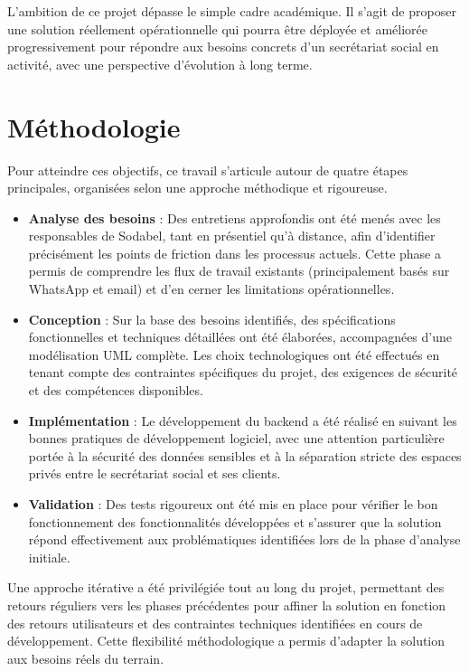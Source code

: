 L'ambition de ce projet dépasse le simple cadre académique. Il s'agit de proposer une solution réellement opérationnelle qui pourra être déployée et améliorée progressivement pour répondre aux besoins concrets d'un secrétariat social en activité, avec une perspective d'évolution à long terme.


\section{Méthodologie}

Pour atteindre ces objectifs, ce travail s'articule autour de quatre étapes principales, organisées selon une approche méthodique et rigoureuse.

\begin{itemize}
  \item \textbf{Analyse des besoins} : Des entretiens approfondis ont été menés avec les responsables de Sodabel, tant en présentiel qu'à distance, afin d'identifier précisément les points de friction dans les processus actuels. Cette phase a permis de comprendre les flux de travail existants (principalement basés sur WhatsApp et email) et d'en cerner les limitations opérationnelles.

  \item \textbf{Conception} : Sur la base des besoins identifiés, des spécifications fonctionnelles et techniques détaillées ont été élaborées, accompagnées d'une modélisation UML complète. Les choix technologiques ont été effectués en tenant compte des contraintes spécifiques du projet, des exigences de sécurité et des compétences disponibles.

  \item \textbf{Implémentation} : Le développement du backend a été réalisé en suivant les bonnes pratiques de développement logiciel, avec une attention particulière portée à la sécurité des données sensibles et à la séparation stricte des espaces privés entre le secrétariat social et ses clients.

  \item \textbf{Validation} : Des tests rigoureux ont été mis en place pour vérifier le bon fonctionnement des fonctionnalités développées et s'assurer que la solution répond effectivement aux problématiques identifiées lors de la phase d'analyse initiale.
\end{itemize}

\begin{note}
Une approche itérative a été privilégiée tout au long du projet, permettant des retours réguliers vers les phases précédentes pour affiner la solution en fonction des retours utilisateurs et des contraintes techniques identifiées en cours de développement. Cette flexibilité méthodologique a permis d'adapter la solution aux besoins réels du terrain.
\end{note}

